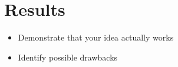\section{Results}
\label{sec:results}
\begin{itemize}
	\item Demonstrate that your idea actually works
	\item Identify possible drawbacks
\end{itemize}

